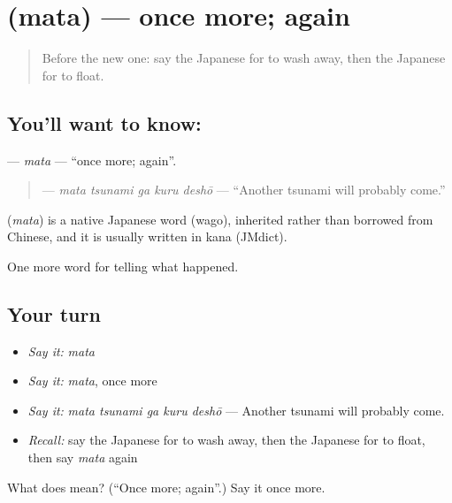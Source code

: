 \section[\texorpdfstring{\ja{また} (mata)}{また (mata)}]{ (mata) — once more; again}

\label{lesson:JA-C275-mata}



\begin{quote}
Before the new one: say the Japanese for to wash away, then the Japanese for to float.
\end{quote}

\subsection*{You'll want to know: }
\textbf{} — \emph{mata} — \textquotedblleft{}once more; again\textquotedblright{}.

\begin{quote}
\textbf{  } — \emph{mata tsunami ga kuru deshō} — \textquotedblleft{}Another tsunami will probably come.\textquotedblright{}
\end{quote}

\begin{cousinweb}
\textbf{} (\emph{mata}) is a native Japanese word (wago), inherited rather than borrowed from Chinese, and it is usually written in kana (JMdict).
\end{cousinweb}

\begin{grammarlens}[title={What you've built}]
One more word for telling what happened.
\end{grammarlens}

\subsection*{Your turn}
\begin{itemize}
\raggedright
  \item \emph{Say it:} \emph{mata}
  \item \emph{Say it:} \emph{mata}, once more
  \item \emph{Say it:} \emph{mata tsunami ga kuru deshō} — Another tsunami will probably come.
  \item \emph{Recall:} say the Japanese for to wash away, then the Japanese for to float, then say \emph{mata} again
\end{itemize}

\begin{tcolorbox}[breakable,colback=teal!4,colframe=teal!35!black,title={Before you move on}]
What does  mean? (\textquotedblleft{}Once more; again\textquotedblright{}.) Say it once more.
\end{tcolorbox}
